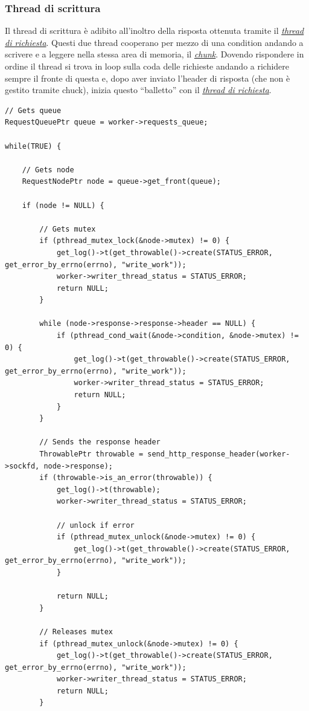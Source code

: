 \documentclass[italian]{tktltiki2}
\begin{document}
\subsubsection{Thread di scrittura}
\label{sec:writer}
Il thread di scrittura è adibito all'inoltro della risposta ottenuta tramite il \hyperref[sec:request]{\emph{thread di richiesta}}. Questi due thread cooperano per mezzo di una condition andando a scrivere e a leggere nella stessa area di memoria, il \hyperref[sec:chunk]{\emph{chunk}}. Dovendo rispondere in ordine il thread si trova in loop sulla coda delle richieste andando a richidere sempre il fronte di questa e, dopo aver inviato l'header di risposta (che non è gestito tramite chuck), inizia questo ``balletto'' con il \hyperref[sec:request]{\emph{thread di richiesta}}.
\begin{lstlisting}
// Gets queue
RequestQueuePtr queue = worker->requests_queue;

while(TRUE) {

    // Gets node
    RequestNodePtr node = queue->get_front(queue);

    if (node != NULL) {

        // Gets mutex
        if (pthread_mutex_lock(&node->mutex) != 0) {
            get_log()->t(get_throwable()->create(STATUS_ERROR, get_error_by_errno(errno), "write_work"));
            worker->writer_thread_status = STATUS_ERROR;
            return NULL;
        }

        while (node->response->response->header == NULL) {
            if (pthread_cond_wait(&node->condition, &node->mutex) != 0) {
                get_log()->t(get_throwable()->create(STATUS_ERROR, get_error_by_errno(errno), "write_work"));
                worker->writer_thread_status = STATUS_ERROR;
                return NULL;
            }
        }

        // Sends the response header
        ThrowablePtr throwable = send_http_response_header(worker->sockfd, node->response);
        if (throwable->is_an_error(throwable)) {
            get_log()->t(throwable);
            worker->writer_thread_status = STATUS_ERROR;

            // unlock if error
            if (pthread_mutex_unlock(&node->mutex) != 0) {
                get_log()->t(get_throwable()->create(STATUS_ERROR, get_error_by_errno(errno), "write_work"));
            }

            return NULL;
        }

        // Releases mutex
        if (pthread_mutex_unlock(&node->mutex) != 0) {
            get_log()->t(get_throwable()->create(STATUS_ERROR, get_error_by_errno(errno), "write_work"));
            worker->writer_thread_status = STATUS_ERROR;
            return NULL;
        }


\end{lstlisting}
\end{document}
